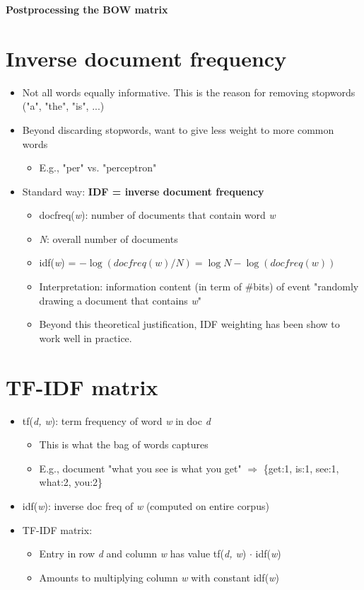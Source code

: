 \documentclass[11pt]{article}
\begin{document}
\vspace{0.5cm}

\begin{center}
  {\LARGE \textbf{Postprocessing the BOW matrix}}
\end{center}
\vspace{0.5cm}
\section*{Inverse document frequency}

\begin{itemize}
	\item Not all words equally informative. This is the reason for removing stopwords ("a", "the", "is", ...)
	\item Beyond discarding stopwords, want to give less weight to more common words
		\begin{itemize}
			\item E.g., "per" vs. "perceptron"
		\end{itemize}
	\item Standard way: \textbf{IDF = inverse document frequency}
		\begin{itemize}
			\item docfreq(\textit{w}): number of documents that contain word \textit{w}
			\item \textit{N}: overall number of documents
			\item idf(\textit{w}) = $-\log(docfreq(w) / N) = \log{N} - \log(docfreq(w))$
			\item Interpretation: information content (in term of #bits) of event "randomly drawing a document that contains \textit{w}"
			\item Beyond this theoretical justification, IDF weighting has been show to work well in practice. 
		\end{itemize}
\end{itemize}

\section*{TF-IDF matrix}
\begin{itemize}
	\item tf(\textit{d, w}): term frequency of word \textit{w} in doc \textit{d}
		\begin{itemize}
			\item This is what the bag of words captures
			\item E.g., document "what you see is what you get" $\Rightarrow$ \{get:1, is:1, see:1, what:2, you:2\}
		\end{itemize}
	\item idf(\textit{w}): inverse doc freq of \textit{w} (computed on entire corpus)
	\item TF-IDF matrix: 
		\begin{itemize}
			\item Entry in row \textit{d} and column \textit{w} has value tf(\textit{d, w}) $\cdot$ idf(\textit{w})
			\item Amounts to multiplying column \textit{w} with constant idf(\textit{w})
		\end{itemize}
\end{itemize}
\end{document}
